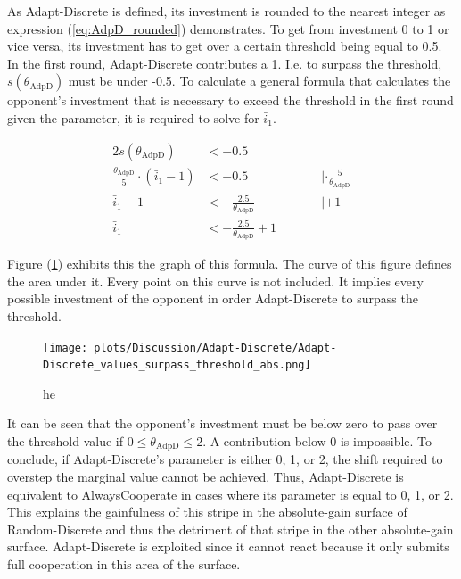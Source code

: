 \documentclass[11pt]{article}
\begin{document}
	As Adapt-Discrete is defined, its investment is rounded to the nearest integer as expression (\ref{eq:AdpD_rounded}) demonstrates.
	To get from investment 0 to 1 or vice versa, its investment has to get over a certain threshold being equal to 0.5.
	In the first round, Adapt-Discrete contributes a 1.
	I.e. to surpass the threshold, $s(\theta_{\mathrm{AdpD}})$ must be under -0.5.
	To calculate a general formula that calculates the opponent's investment that is necessary to exceed the threshold in the first round given the parameter, it is required to solve for $\bar i_1$.

	\begin{alignat*}{2}
		s(\theta_{\mathrm{AdpD}}) &< -0.5 &&\\
		\frac{\theta_{\mathrm{AdpD}}}{5} \cdot (\bar i_1 - 1) &< -0.5 &&\qquad | \cdot \frac{5}{\theta_{\mathrm{AdpD}}} \\
		\bar i_1 - 1 &< -\frac{2.5}{\theta_{\mathrm{AdpD}}} &&\qquad | + 1 \\
		\bar i_1 &< -\frac{2.5}{\theta_{\mathrm{AdpD}}} + 1 &&
	\end{alignat*}

	Figure (\ref{fig:surpass_theshold_abs}) exhibits this the graph of this formula.
	The curve of this figure defines the area under it.
	Every point on this curve is not included.
	It implies every possible investment of the opponent in order Adapt-Discrete to surpass the threshold.
	\begin{figure}[h]
		\begin{center}
			\texttt{[image: plots/Discussion/Adapt-Discrete/Adapt-Discrete\_values\_surpass\_threshold\_abs.png]}
		\end{center}
		\caption{he}
		\label{fig:surpass_theshold_abs}
	\end{figure}

	It can be seen that the opponent's investment must be below zero to pass over the threshold value if $0 \le \theta_{\mathrm{AdpD}} \le 2$.
	A contribution below 0 is impossible.
	To conclude, if Adapt-Discrete's parameter is either 0, 1, or 2, the shift required to overstep the marginal value cannot be achieved.
	Thus, Adapt-Discrete is equivalent to AlwaysCooperate in cases where its parameter is equal to 0, 1, or 2.\\
	This explains the gainfulness of this stripe in the absolute-gain surface of Random-Discrete and thus the detriment of that stripe in the other absolute-gain surface.
	Adapt-Discrete is exploited since it cannot react because it only submits full cooperation in this area of the surface.\\
\end{document}
